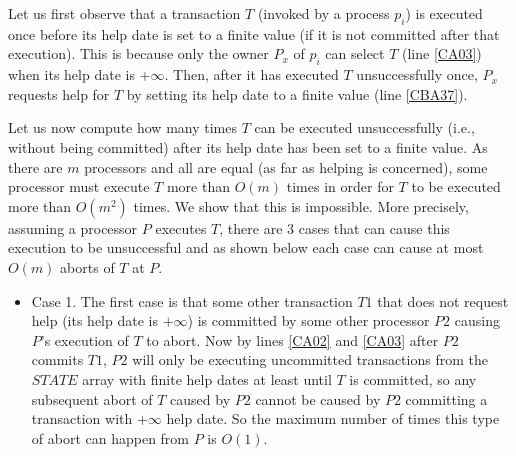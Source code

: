 \begin{proofT}
Let  us first   observe  that a  transaction  $T$  (invoked by  a process
$p_i$)  is executed once before its  help date is  set  to a finite value
(if it is not committed after that execution).
This is  because only the owner $P_x$ of $p_i$ can  select $T$
(line \ref{CA03}) when its help date is  $+\infty$.
Then, after it has  executed $T$ unsuccessfully once, $P_x$  requests
help for $T$ by setting its  help date to a finite value (line \ref{CBA37}).

Let us now compute   how many  times $T$  can  be  executed unsuccessfully
(i.e.,  without being committed) after its help date has been  set to a
finite value.
As there  are  $m$   processors and all  are equal (as far as  helping is
concerned),   some  processor must execute $T$  more  than $O(m)$ times
in  order for  $T$  to be  executed more  than $O(m^2)$ times.
We show that this is impossible. More precisely,
assuming  a processor $P$ executes  $T$, there are $3$ cases that can cause
this execution to be unsuccessful  and as shown below
each case can cause at most $O(m)$ aborts of $T$ at $P$.
%
\begin{itemize}

\item
Case 1. The first case  is that some other transaction $T1$ that does
not  request help  (its help date is $+\infty$)  is committed  by some  other
processor $P2$ causing $P$'s execution of $T$ to abort.
Now by lines  \ref{CA02} and \ref{CA03} after $P2$  commits $T1$, $P2$ will
only  be executing  uncommitted transactions  from the  $\mathit{STATE}$
 array with
finite help dates at least until  $T$ is committed, so any subsequent abort
of $T$ caused  by $P2$ cannot be caused by  $P2$ committing a transaction
with $+\infty$ help date.
So the maximum  number of times this  type of abort can happen  from $P$ is
$O(1)$.


\end{itemize}
\end{proofT}
